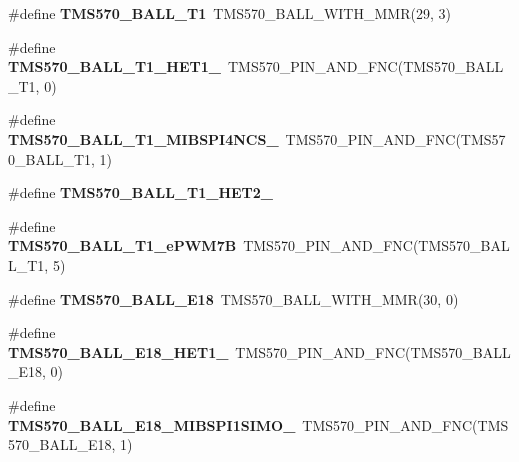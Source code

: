 \begin{DoxyCompactItemize}
\item 
\mbox{\label{tms570lc4357-pins_8h_adad07deb9650001d6157a93c2853bc51}} 
\#define {\bfseries T\+M\+S570\+\_\+\+B\+A\+L\+L\+\_\+\+T1}~T\+M\+S570\+\_\+\+B\+A\+L\+L\+\_\+\+W\+I\+T\+H\+\_\+\+M\+MR(29, 3)
\item 
\mbox{\label{tms570lc4357-pins_8h_aa23e309646fad1a636e8de59a1d4d4a1}} 
\#define {\bfseries T\+M\+S570\+\_\+\+B\+A\+L\+L\+\_\+\+T1\+\_\+\+H\+E\+T1\+\_}~T\+M\+S570\+\_\+\+P\+I\+N\+\_\+\+A\+N\+D\+\_\+\+F\+NC(T\+M\+S570\+\_\+\+B\+A\+L\+L\+\_\+\+T1, 0)
\item 
\mbox{\label{tms570lc4357-pins_8h_adffc3289617a138ac65cf0e9b805fd37}} 
\#define {\bfseries T\+M\+S570\+\_\+\+B\+A\+L\+L\+\_\+\+T1\+\_\+\+M\+I\+B\+S\+P\+I4\+N\+C\+S\+\_}~T\+M\+S570\+\_\+\+P\+I\+N\+\_\+\+A\+N\+D\+\_\+\+F\+NC(T\+M\+S570\+\_\+\+B\+A\+L\+L\+\_\+\+T1, 1)
\item 
\#define {\bfseries T\+M\+S570\+\_\+\+B\+A\+L\+L\+\_\+\+T1\+\_\+\+H\+E\+T2\+\_}
\item 
\mbox{\label{tms570lc4357-pins_8h_ac5fb771a7e87aa907e099ae0ae3d6654}} 
\#define {\bfseries T\+M\+S570\+\_\+\+B\+A\+L\+L\+\_\+\+T1\+\_\+e\+P\+W\+M7B}~T\+M\+S570\+\_\+\+P\+I\+N\+\_\+\+A\+N\+D\+\_\+\+F\+NC(T\+M\+S570\+\_\+\+B\+A\+L\+L\+\_\+\+T1, 5)
\item 
\mbox{\label{tms570lc4357-pins_8h_a7a5660d9f1c5b62564a03c3d5fe40760}} 
\#define {\bfseries T\+M\+S570\+\_\+\+B\+A\+L\+L\+\_\+\+E18}~T\+M\+S570\+\_\+\+B\+A\+L\+L\+\_\+\+W\+I\+T\+H\+\_\+\+M\+MR(30, 0)
\item 
\mbox{\label{tms570lc4357-pins_8h_aea3d87a03d6b1aa00e4e4de6828e17ba}} 
\#define {\bfseries T\+M\+S570\+\_\+\+B\+A\+L\+L\+\_\+\+E18\+\_\+\+H\+E\+T1\+\_}~T\+M\+S570\+\_\+\+P\+I\+N\+\_\+\+A\+N\+D\+\_\+\+F\+NC(T\+M\+S570\+\_\+\+B\+A\+L\+L\+\_\+\+E18, 0)
\item 
\mbox{\label{tms570lc4357-pins_8h_a010def489f696d18039a945ea8718e2a}} 
\#define {\bfseries T\+M\+S570\+\_\+\+B\+A\+L\+L\+\_\+\+E18\+\_\+\+M\+I\+B\+S\+P\+I1\+S\+I\+M\+O\+\_}~T\+M\+S570\+\_\+\+P\+I\+N\+\_\+\+A\+N\+D\+\_\+\+F\+NC(T\+M\+S570\+\_\+\+B\+A\+L\+L\+\_\+\+E18, 1)

\end{DoxyCompactItemize}
